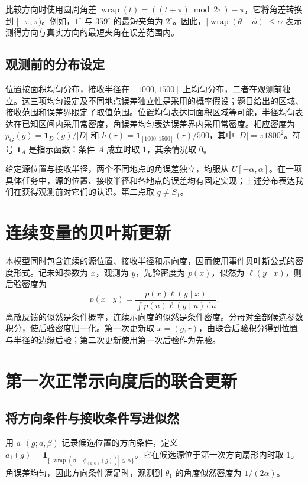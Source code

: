 \documentclass[UTF8,a4paper,zihao=-4,fontset=none]{ctexart}
\numberwithin{equation}{section}
\newcommand{\ind}{\mathbf 1}
\newcommand{\dd}{\,\mathrm d}
\newcommand{\wrap}{\operatorname{wrap}}
\begin{document}
比较方向时使用圆周角差 \(\wrap(t)=((t+\pi)\bmod2\pi)-\pi\)，它将角差转换到 \([-\pi,\pi)\)。例如，\(1^\circ\) 与 \(359^\circ\) 的最短夹角为 \(2^\circ\)。因此，\(|\wrap(\theta-\phi)|\le\alpha\) 表示测得方向与真实方向的最短夹角在误差范围内。

\subsection{观测前的分布设定}
位置按面积均匀分布，接收半径在 \([1000,1500]\) 上均匀分布，二者在观测前独立。这三项均匀设定及不同地点误差独立性是采用的概率假设；题目给出的区域、接收范围和误差界限定了取值范围。位置均匀表达同面积区域等可能，半径均匀表达在已知区间内采用常密度，角误差均匀表达误差界内采用常密度。相应密度为 \(p_G(g)=\ind_D(g)/|D|\) 和 \(h(r)=\ind_{[1000,1500]}(r)/500\)，其中 \(|D|=\pi1800^2\)。符号 \(\ind_A\) 是指示函数：条件 \(A\) 成立时取 \(1\)，其余情况取 \(0\)。

给定源位置与接收半径，两个不同地点的角误差独立，均服从 \(U[-\alpha,\alpha]\)。在一项具体任务中，源的位置、接收半径和各地点的误差均有固定实现；上述分布表达我们在获得观测前对它们的认识。第二点取 \(q\ne S_1\)。

\section{连续变量的贝叶斯更新}
本模型同时包含连续的源位置、接收半径和示向度，因而使用事件贝叶斯公式的密度形式。记未知参数为 \(x\)，观测为 \(y\)，先验密度为 \(p(x)\)，似然为 \(\ell(y\mid x)\)，则后验密度为
\begin{equation}\label{eq:bayes}
p(x\mid y)=\frac{p(x)\ell(y\mid x)}{\int p(u)\ell(y\mid u)\dd u}.
\end{equation}
离散反馈的似然是条件概率，连续示向度的似然是条件密度。分母对全部候选参数积分，使后验密度归一化。第一次更新取 \(x=(g,r)\)，由联合后验积分得到位置与半径的边缘后验；第二次更新使用第一次后验作为先验。

\section{第一次正常示向度后的联合更新}
\subsection{将方向条件与接收条件写进似然}
用 \(a_1(g;a,\beta)\) 记录候选位置的方向条件，定义 \(a_1(g)=\ind_{\{|\wrap(\beta-\phi_{(a,0)}(g))|\le\alpha\}}\)。它在候选源位于第一次方向扇形内时取 \(1\)。角误差均匀，因此方向条件满足时，观测到 \(\theta_1\) 的角度似然密度为 \(1/(2\alpha)\)。
\end{document}
